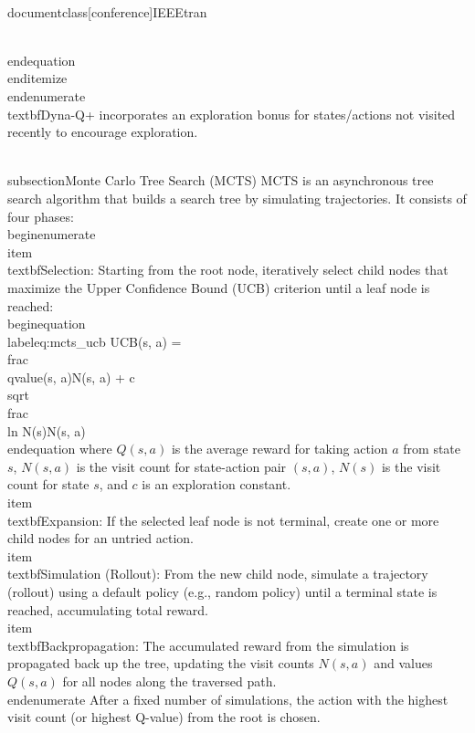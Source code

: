 \\documentclass[conference]{IEEEtran}
\begin{document}
        \\end{equation}
    \\end{itemize}
\\end{enumerate}
\\textbf{Dyna-Q+} incorporates an exploration bonus for states/actions not visited recently to encourage exploration.

\\subsection{Monte Carlo Tree Search (MCTS)}
MCTS \cite{browne2012mcts} is an asynchronous tree search algorithm that builds a search tree by simulating trajectories. It consists of four phases:
\\begin{enumerate}
    \\item \\textbf{Selection}: Starting from the root node, iteratively select child nodes that maximize the Upper Confidence Bound (UCB) criterion until a leaf node is reached:
    \\begin{equation}
    \\label{eq:mcts_ucb}
    UCB(s, a) = \\frac{\\qvalue(s, a)}{N(s, a)} + c \\sqrt{\\frac{\\ln N(s)}{N(s, a)}}
    \\end{equation}
    where $Q(s,a)$ is the average reward for taking action $a$ from state $s$, $N(s,a)$ is the visit count for state-action pair $(s,a)$, $N(s)$ is the visit count for state $s$, and $c$ is an exploration constant.
    \\item \\textbf{Expansion}: If the selected leaf node is not terminal, create one or more child nodes for an untried action.
    \\item \\textbf{Simulation (Rollout)}: From the new child node, simulate a trajectory (rollout) using a default policy (e.g., random policy) until a terminal state is reached, accumulating total reward.
    \\item \\textbf{Backpropagation}: The accumulated reward from the simulation is propagated back up the tree, updating the visit counts $N(s,a)$ and values $Q(s,a)$ for all nodes along the traversed path.
\\end{enumerate}
After a fixed number of simulations, the action with the highest visit count (or highest Q-value) from the root is chosen.
\end{document}
